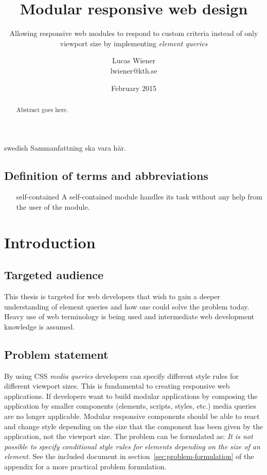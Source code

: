 \documentclass[a4paper,11pt]{kth-mag}
\title{Modular responsive web design}
\subtitle{Allowing responsive web modules to respond to custom criteria instead of only viewport size by implementing \emph{element queries}}
\author{Lucas Wiener \\ \lowercase{lwiener@kth.se}}
\date{February 2015}
\newcommand\abbr[2][]{\uppercase{#2}\ifthenelse{\equal{#1}{}}%
                     {}{#1}}
\begin{document}
  \frontmatter
  \pagestyle{empty}
  \removepagenumbers
  \maketitle
  \begin{abstract}
    Abstract goes here.
  \end{abstract}
  \clearpage
  \begin{foreignabstract}{swedish}
    Sammanfattning ska vara här.
  \end{foreignabstract}
  \clearpage
  \tableofcontents*
  \listoftodos
  \mainmatter
  \section*{Definition of terms and abbreviations}
    \begin{itemize}
      \item[self-contained] A self-contained module handles its task without any help from the user of the module.
    \end{itemize}
  \pagestyle{newchap}
  \chapter{Introduction}
    \section{Targeted audience}
      This thesis is targeted for web developers that wish to gain a deeper understanding of element queries and how one could solve the problem today.
      Heavy use of web terminology is being used and intermediate web development knowledge is assumed.
    \section{Problem statement}
      By using \abbr{css} \emph{media queries} developers can specify different style rules for different viewport sizes.
      This is fundamental to creating responsive web applications.
      If developers want to build modular applications by composing the application by smaller components (elements, scripts, styles, etc.) media queries are no longer applicable.
      Modular responsive components should be able to react and change style depending on the size that the component has been given by the application, not the viewport size.
      The problem can be formulated as: \emph{It is not possible to specify conditional style rules for elements depending on the size of an element}.
      See the included document in section~\ref{sec:problem-formulation} of the appendix for a more practical problem formulation.
\end{document}

